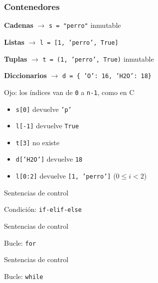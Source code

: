 \documentclass{beamer}
\begin{document}
\begin{frame}\frametitle{Contenedores}
	\textbf{Cadenas} $\rightarrow$ \texttt{s = "perro"} {\tiny inmutable}

	\textbf{Listas} $\rightarrow$ \texttt{l = [1, 'perro', True]}

	\textbf{Tuplas} $\rightarrow$ \texttt{t = (1, 'perro', True)} {\tiny inmutable}

	\textbf{Diccionarios} $\rightarrow$ \texttt{d = \{ 'O': 16, 'H2O': 18\}}

	\begin{alertblock}{Ojo: los índices van de \texttt{0} a \texttt{n-1}, como en C}
		\begin{itemize}
			\item \texttt{s[0]} devuelve \texttt{'p'}
			\item \texttt{l[-1]} devuelve \texttt{True}
			\item \texttt{t[3]} no existe
			\item \texttt{d['H2O']} devuelve \texttt{18}
			\item \texttt{l[0:2]} devuelve \texttt{[1, 'perro']} ($0 \leq i < 2$)
		\end{itemize}
	\end{alertblock}
\end{frame}


\begin{frame}{Sentencias de control}
	\begin{block}{Condición: \texttt{if-elif-else}}
		
	\end{block}
\end{frame}

\begin{frame}{Sentencias de control}
	\begin{block}{Bucle: \texttt{for}}
		
	\end{block}
\end{frame}

\begin{frame}{Sentencias de control}
	\begin{block}{Bucle: \texttt{while}}
		
	\end{block}
\end{frame}
\end{document}
